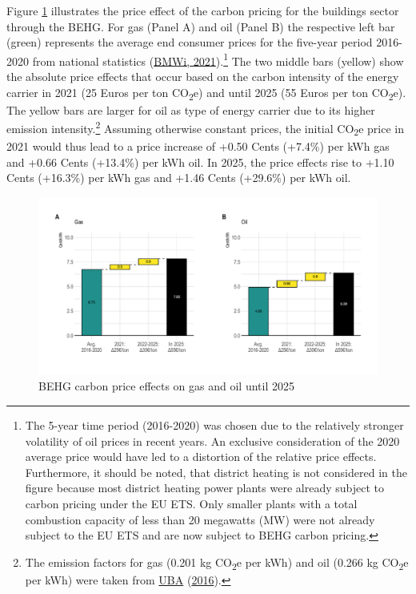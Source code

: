 \documentclass[12pt,twoside]{reedthesis}
\begin{document}
Figure \ref{fig:behg} illustrates the price effect of the carbon pricing for the buildings sector through the BEHG. For gas (Panel A) and oil (Panel B) the respective left bar (green) represents the average end consumer prices for the five-year period 2016-2020 from national statistics (\protect\hyperlink{ref-bmwi21}{BMWi, 2021}).\footnote{The 5-year time period (2016-2020) was chosen due to the relatively stronger volatility of oil prices in recent years. An exclusive consideration of the 2020 average price would have led to a distortion of the relative price effects. Furthermore, it should be noted, that district heating is not considered in the figure because most district heating power plants were already subject to carbon pricing under the EU ETS. Only smaller plants with a total combustion capacity of less than 20 megawatts (MW) were not already subject to the EU ETS and are now subject to BEHG carbon pricing.} The two middle bars (yellow) show the absolute price effects that occur based on the carbon intensity of the energy carrier in 2021 (25 Euros per ton CO\textsubscript{2}e) and until 2025 (55 Euros per ton CO\textsubscript{2}e). The yellow bars are larger for oil as type of energy carrier due to its higher emission intensity.\footnote{The emission factors for gas (0.201 kg CO\textsubscript{2}e per kWh) and oil (0.266 kg CO\textsubscript{2}e per kWh) were taken from \protect\hyperlink{ref-uba16}{UBA} (\protect\hyperlink{ref-uba16}{2016}).} Assuming otherwise constant prices, the initial CO\textsubscript{2}e price in 2021 would thus lead to a price increase of +0.50 Cents (+7.4\%) per kWh gas and +0.66 Cents (+13.4\%) per kWh oil. In 2025, the price effects rise to +1.10 Cents (+16.3\%) per kWh gas and +1.46 Cents (+29.6\%) per kWh oil.
\begin{figure}

{\centering \includegraphics[width=1\linewidth]{figure/price_effect_behg} 

}

\caption[BEHG carbon price effects on gas and oil until 2025]{BEHG carbon price effects on gas and oil until 2025}\label{fig:behg}
\end{figure}
\end{document}
